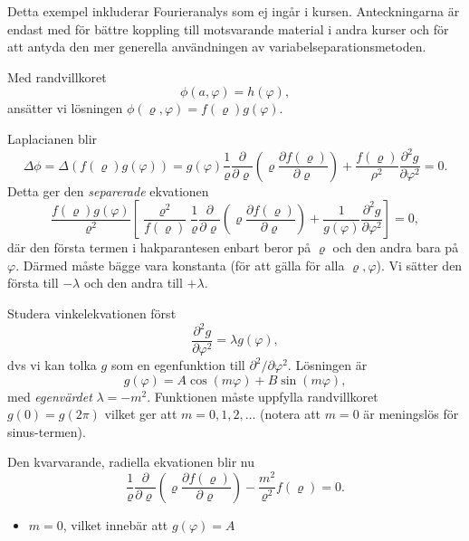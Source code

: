 \documentclass[%
oneside,                 %
final,                   %
10pt]{article}
\newenvironment{notice_mdfboxadmon}[1][]{
\begin{notice_mdfboxmdframed}[frametitle=#1]
}
{
\end{notice_mdfboxmdframed}
}
\newenvironment{warning_mdfboxadmon}[1][]{
\begin{warning_mdfboxmdframed}[frametitle=#1]
}
{
\end{warning_mdfboxmdframed}
}
\begin{document}
\begin{notice_mdfboxadmon}


\begin{warning_mdfboxadmon}[OBS!]
Detta exempel inkluderar Fourieranalys som ej ingår i kursen. Anteckningarna är endast med för bättre koppling till motsvarande material i andra kurser och för att antyda den mer generella användningen av variabelseparationsmetoden.
\end{warning_mdfboxadmon} %



Med randvillkoret
$$
\phi(a,\varphi)=h(\varphi),
$$
ansätter vi lösningen $\phi(\varrho,\varphi) = f(\varrho) g(\varphi)$.

Laplacianen blir
$$
\Delta \phi = \Delta \left( f(\varrho) g(\varphi) \right) = g(\varphi) \frac{1}{\varrho} \frac{\partial}{\partial\varrho} \left( \varrho \frac{\partial f(\varrho)}{\partial\varrho} \right) + \frac{f(\varrho)}{\rho^2} \frac{\partial^2 g}{\partial\varphi^2} = 0.
$$
Detta ger den \emph{separerade} ekvationen
$$
\frac{f(\varrho) g(\varphi)}{\varrho^2} \left[ \frac{\varrho^2}{f(\varrho)} \frac{1}{\varrho} \frac{\partial}{\partial\varrho} \left( \varrho \frac{\partial f(\varrho)}{\partial\varrho} \right) + \frac{1}{g(\varphi)} \frac{\partial^2 g}{\partial\varphi^2} \right] = 0,
$$
där den första termen i hakparantesen enbart beror på $\varrho$ och den andra bara på $\varphi$. Därmed måste bägge vara konstanta (för att gälla för alla $\varrho,\varphi$). Vi sätter den första till $-\lambda$ och den andra till $+\lambda$.

Studera vinkelekvationen först
$$
\frac{\partial^2 g}{\partial\varphi^2} = \lambda g(\varphi),
$$
dvs vi kan tolka $g$ som en egenfunktion till $\partial^2 / \partial\varphi^2$. Lösningen är
$$
g(\varphi) = A \cos (m \varphi) + B \sin (m \varphi),
$$
med \emph{egenvärdet} $\lambda = -m^2$. Funktionen måste uppfylla randvillkoret $g(0) = g(2\pi)$ vilket ger att $m = 0,1,2,\ldots$ (notera att $m=0$ är meningslös för sinus-termen).

Den kvarvarande, radiella ekvationen blir nu
$$
\frac{1}{\varrho} \frac{\partial}{\partial\varrho} \left( \varrho \frac{\partial f(\varrho)}{\partial\varrho} \right) - \frac{m^2}{\varrho^2} f(\varrho) = 0.
$$

\begin{itemize}
\item $m=0$, vilket innebär att $g(\varphi) = A$
\end{itemize}


\end{notice_mdfboxadmon}
\end{document}
